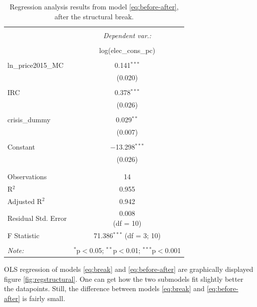   \begin{table}[!htbp] \centering 
    \caption{Regression analysis results from model \eqref{eq:before-after}, after the structural break.} 
    \label{regression_after} 
  \begin{tabular}{@{\extracolsep{0pt}}lc} 
  \\[-1.8ex]\hline 
  \hline \\[-1.8ex] 
   & \multicolumn{1}{c}{\textit{Dependent var.:}} \\ 
  \cline{2-2} 
  \\[-1.8ex] & log(elec\_cons\_pc) \\ 
  \hline \\[-1.8ex] 
   ln\_price2015\_MC & 0.141$^{***}$ \\ 
    & (0.020) \\ 
    & \\ 
   IRC & 0.378$^{***}$ \\ 
    & (0.026) \\ 
    & \\ 
   crisis\_dummy & 0.029$^{**}$ \\ 
    & (0.007) \\ 
    & \\ 
   Constant & $-$13.298$^{***}$ \\ 
    & (0.026) \\ 
    & \\ 
  \hline \\[-1.8ex] 
  Observations & 14 \\ 
  R$^{2}$ & 0.955 \\ 
  Adjusted R$^{2}$ & 0.942 \\ 
  Residual Std. Error & \makecell{0.008 \\(df = 10)} \\ 
  F Statistic & \makecell{71.386$^{***}$ \\ (df = 3; 10)} \\ 
  \hline 
  \hline \\[-1.8ex] 
  \textit{Note:}  & \multicolumn{1}{r}{$^{*}$p$<$0.05; $^{**}$p$<$0.01; $^{***}$p$<$0.001} \\ 
  \end{tabular} 
  \end{table} 
  
  OLS regression of models \eqref{eq:break} and \eqref{eq:before-after} are graphically displayed figure \ref{fig:regstructural}. One can get how the two submodels fit slightly better the datapoints. Still, the difference between models \eqref{eq:break} and \eqref{eq:before-after} is fairly small.

